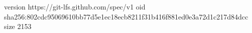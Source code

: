 version https://git-lfs.github.com/spec/v1
oid sha256:802cdc95069610bb77d5e1ec18ecb8211f31b416f881ed0e3a72d1c217d84dcc
size 2153
